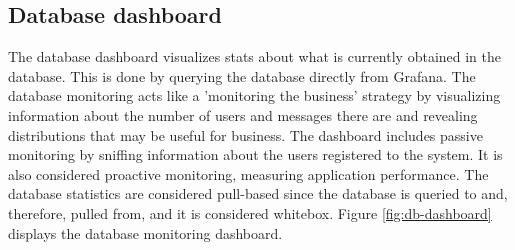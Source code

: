 \documentclass[12pt, a4paper, oneside]{book}
\begin{document}


    
    
    

\subsection{Database dashboard}
The database dashboard visualizes stats about what is currently obtained in the database.
This is done by querying the database directly from Grafana.
The database monitoring acts like a 'monitoring the business' strategy by visualizing information about the number of users and messages there are and revealing distributions that may be useful for business.
The dashboard includes passive monitoring by sniffing information about the users registered to the system.
It is also considered proactive monitoring, measuring application performance.
The database statistics are considered pull-based since the database is queried to and, therefore, pulled from, and it is considered whitebox.
Figure \ref{fig:db-dashboard} displays the database monitoring dashboard.
\end{document}
